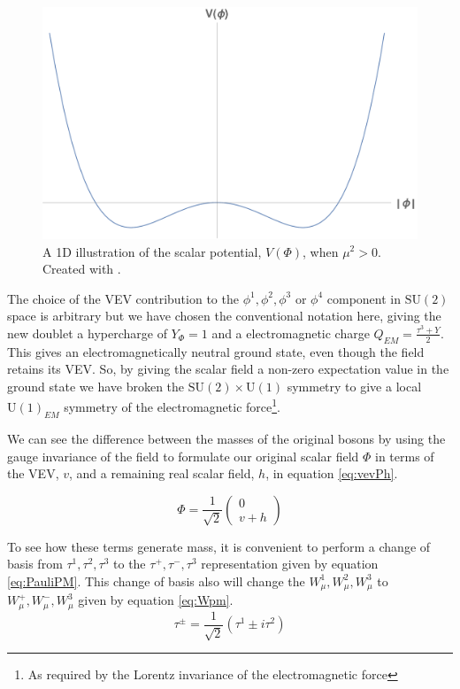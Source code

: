 \begin{figure}
\begin{center}
\includegraphics[width=0.75\linewidth]{Introduction/Mexican_Hat_1D.pdf}
\caption[A 1D illustration of the scalar potential, $V\left(\Phi\right)$, when $\mu^2 > 0$.]{A 1D illustration of the scalar potential, $V\left(\Phi\right)$, when $\mu^2 > 0$. Created with \cite{Mathematica10_1}.}
\label{fig:1Dbroken}
\end{center}
\end{figure}

The choice of the VEV contribution to the $\phi^{1}, \phi^{2}, \phi^{3} \text{ or } \phi^{4}$ component in $\mathrm{SU}(2)$ space is arbitrary but we have chosen the conventional notation here, giving the new doublet a hypercharge of $Y_{\Phi} = 1$ and a electromagnetic charge $Q_{EM} = \frac{\tau^{3} + Y}{2}$. This gives an electromagnetically neutral ground state, even though the field retains its VEV. So, by giving the scalar field a non-zero expectation value in the ground state we have broken the $\mathrm{SU}(2) \times \mathrm{U}(1)$ symmetry to give a local $\mathrm{U}(1)_{EM}$ symmetry of the electromagnetic force\footnote{As required by the Lorentz invariance of the electromagnetic force}.

We can see the difference between the masses of the original bosons by using the gauge invariance of the field to formulate our original scalar field $\Phi$ in terms of the VEV, $v$, and a remaining real scalar field, $h$, in equation \eqref{eq:vevPh}.

\begin{equation}
\label{eq:vevPh}
\Phi =  \frac{1}{\sqrt{2}} \begin{pmatrix} 0 \\ v + h \end{pmatrix}
\end{equation}

To see how these terms generate mass, it is convenient to perform a change of basis from $\tau^{1}, \tau^{2}, \tau^{3}$ to the $\tau^{+}, \tau^{-}, \tau^{3}$ representation given by equation \eqref{eq:PauliPM}. This change of basis also will change the $W^{1}_{\mu}, W^{2}_{\mu}, W^{3}_{\mu}$ to  $W^{+}_{\mu}, W^{-}_{\mu}, W^{3}_{\mu}$ given by equation \eqref{eq:Wpm}.
\begin{equation}
\label{eq:PauliPM}
\tau^{\pm}  =  \frac{1}{\sqrt{2}}\left(\tau^{1} \pm i \tau^{2}\right)
\end{equation}

